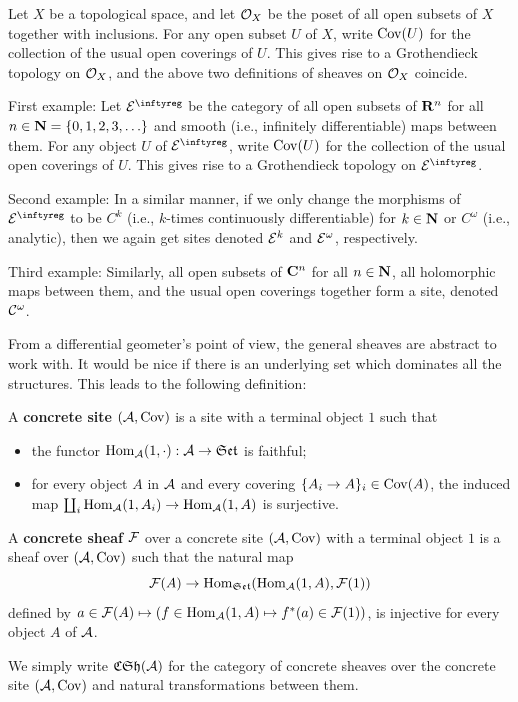 \begin{example}
  Let $X$ be a topological space,
  and let $\mathcal{O}_X$ be the poset of all open subsets of $X$ together with inclusions.
  For any open subset $U$ of $X$,
  write $\mathrm{Cov}(U)$ for the collection of the usual open coverings of $U$.
  This gives rise to a Grothendieck topology on $\mathcal{O}_X$,
  and the above two definitions of sheaves on $\mathcal{O}_X$ coincide.
\end{example}

\begin{example}
  First example: Let $\cE^\infty$ be the category of all open subsets of $\mathbf{R}^n$ for all $n \in \mathbf{N}=\{0,1,2,3,\ldots\}$ and smooth (i.e., infinitely differentiable) maps between them.
  For any object $U$ of $\cE^\infty$,
  write $\mathrm{Cov}(U)$ for the collection of the usual open coverings of $U$.
  This gives rise to a Grothendieck topology on $\cE^\infty$.

  Second example: In a similar manner,
  if we only change the morphisms of $\cE^\infty$ to be $C^k$ (i.e., $k$-times continuously differentiable) for $k \in \mathbf{N}$ or $C^\omega$ (i.e., analytic), then we again get sites denoted $\mathcal{E}^k$ and $\mathcal{E}^\omega$, respectively.

  Third example: Similarly, all open subsets of $\mathbf{C}^n$ for all $n \in \mathbf{N}$,
  all holomorphic maps between them,
  and the usual open coverings together form a site,
  denoted $\mathcal{C}^\omega$.
\end{example}

From a differential geometer's point of view,
the general sheaves are abstract to work with.
It would be nice if there is an underlying set which dominates all the structures.
This leads to the following definition:

\begin{definition}
  A \textbf{concrete site} $(\mathcal{A},\mathrm{Cov})$ is a site with a terminal object $1$ such that
  \begin{itemize}
    \item[*] the functor $\mathrm{Hom}_{\mathcal{A}}(1,\cdot):\mathcal{A} \to \mathfrak{Set}$ is faithful;
    \item[*] for every object $A$ in $\mathcal{A}$ and every covering $\{A_i \to A\}_i \in \mathrm{Cov}(A)$,
    the induced map $\coprod_i \mathrm{Hom}_{\mathcal{A}}(1,A_i) \to \mathrm{Hom}_{\mathcal{A}}(1,A)$ is surjective.
  \end{itemize}
  A \textbf{concrete sheaf} $\mathcal{F}$ over a concrete site $(\mathcal{A},\mathrm{Cov})$ with a terminal object $1$ is a sheaf over $(\mathcal{A},\mathrm{Cov})$ such that the natural map
  $$
    \mathcal{F}(A) \to \mathrm{Hom}_{\mathfrak{Set}}(\mathrm{Hom}_{\mathcal{A}}(1,A),\mathcal{F}(1))
  $$
  defined by $a \in \mathcal{F}(A) \mapsto (f \in \mathrm{Hom}_{\mathcal{A}}(1,A) \mapsto f^*(a) \in \mathcal{F}(1))$,
  is injective for every object $A$ of $\mathcal{A}$.

  We simply write $\mathfrak{CSh}(\mathcal{A})$ for the category of concrete sheaves over the concrete site $(\mathcal{A},\mathrm{Cov})$ and natural transformations between them.
\end{definition}

